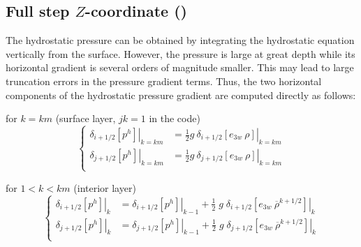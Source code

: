 \documentclass[../tex_main/NEMO_manual]{subfiles}
\begin{document}
\subsection{Full step $Z$-coordinate (\protect{})}
\label{subsec:DYN_hpg_zco}

The hydrostatic pressure can be obtained by integrating the hydrostatic equation 
vertically from the surface. However, the pressure is large at great depth while its 
horizontal gradient is several orders of magnitude smaller. This may lead to large 
truncation errors in the pressure gradient terms. Thus, the two horizontal components 
of the hydrostatic pressure gradient are computed directly as follows:

for $k=km$ (surface layer, $jk=1$ in the code)
\begin{equation} \label{eq:dynhpg_zco_surf}
\left\{ \begin{aligned}
					\left. \delta _{i+1/2} \left[  p^h 			 \right] \right|_{k=km} 
&= \frac{1}{2} g \ 	\left. \delta _{i+1/2} \left[  e_{3w} \ \rho \right] \right|_{k=km}   \\
     					\left. \delta _{j+1/2} \left[  p^h  			 \right] \right|_{k=km} 
&= \frac{1}{2} g \ 	\left. \delta _{j+1/2} \left[  e_{3w} \ \rho \right] \right|_{k=km}   \\
\end{aligned} \right.
\end{equation} 

for $1<k<km$ (interior layer)
\begin{equation} \label{eq:dynhpg_zco}
\left\{ \begin{aligned}
					\left. \delta _{i+1/2} \left[  p^h 			 \right] \right|_{k} 
&=					\left. \delta _{i+1/2} \left[  p^h 			 \right] \right|_{k-1} 
+    \frac{1}{2}\;g\;	\left. \delta _{i+1/2} \left[  e_{3w} \ \overline {\rho}^{k+1/2} \right] \right|_{k}   \\
     					\left. \delta _{j+1/2} \left[  p^h  			 \right] \right|_{k} 
&=     				\left. \delta _{j+1/2} \left[  p^h  			 \right] \right|_{k-1} 
+    \frac{1}{2}\;g\;	\left. \delta _{j+1/2} \left[  e_{3w} \ \overline {\rho}^{k+1/2} \right] \right|_{k}   \\
\end{aligned} \right.
\end{equation} 
\end{document}

